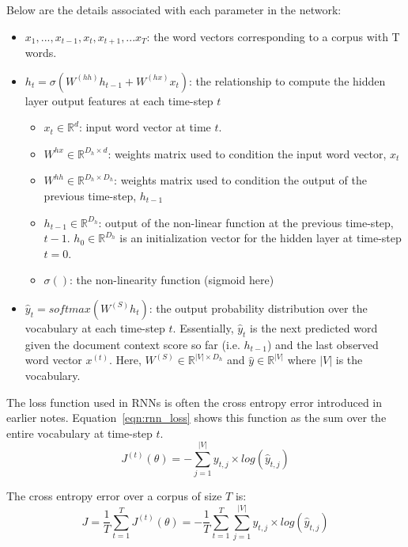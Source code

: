 \documentclass{tufte-handout}
\begin{document}
Below are the details associated with each parameter in the network:
\begin{itemize}
	\item $x_1, ..., x_{t-1}, x_t, x_{t+1}, ... x_{T}$: the word vectors corresponding to a corpus with T words.
	\item $h_t = \sigma(W^{(hh)} h_{t-1} + W^{(hx)} x_{t})$: the relationship to compute the hidden layer output features at each time-step $t$
	\begin{itemize}
		\item $x_{t} \in \mathbb{R}^{d}$: input word vector at time $t$. 
		\item $W^{hx} \in \mathbb{R}^{D_h \times d}$: weights matrix used to condition the input word vector, $x_t$
		\item $W^{hh} \in \mathbb{R}^{D_h \times D_h}$: weights matrix used to condition the output of the previous time-step, $h_{t-1}$
		\item $h_{t-1}  \in \mathbb{R}^{D_h}$: output of the non-linear function at the previous time-step, $t-1$. $h_0 \in \mathbb{R}^{D_h}$ is an initialization vector for the hidden layer at time-step $t = 0$.
		\item $\sigma ()$: the non-linearity function (sigmoid here)
	\end{itemize}
	\item $\hat{y}_t = softmax (W^{(S)}h_t)$: the output probability distribution over the vocabulary at each time-step $t$. Essentially, $\hat{y}_t$ is the next predicted word given the document context score so far (i.e. $h_{t-1}$) and the last observed word vector $x^{(t)}$. Here, $W^{(S)} \in \mathbb{R}^{|V| \times D_h}$ and $\hat{y} \in \mathbb{R}^{|V|}$ where $|V|$ is the vocabulary.
\end{itemize}

The loss function used in RNNs is often the cross entropy error introduced in earlier notes. Equation~\ref{eqn:rnn_loss} shows this function as the sum over the entire vocabulary at time-step $t$.
\begin{equation}
	J^{(t)}(\theta) = - \sum_{j=1}^{|V|} y_{t,j} \times log (\hat{y}_{t,j})
	\label {eqn:rnn_loss}
\end{equation}

The cross entropy error over a corpus of size $T$ is:
\begin{equation}
	J = \dfrac{1}{T} \sum_{t=1}^{T} J^{(t)}(\theta) = - \dfrac{1}{T} \sum_{t=1}^{T} \sum_{j=1}^{|V|} y_{t,j} \times log (\hat{y}_{t,j})
	\label {eqn:rnn_loss_T}
\end{equation}
\end{document}
